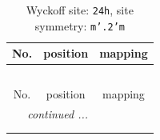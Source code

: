 \documentclass[fleqn,8pt]{jsarticle}
\begin{document}
\renewcommand{\arraystretch}{1.2}
\begin{longtable}{ccc}
\caption{Wyckoff site: {\tt 24h}, site symmetry: {\tt m'.2'm}}
 \\
 \hline \hline
No. & position & mapping \\ \hline \endfirsthead

\multicolumn{2}{l}{\tablename\ \thetable{}} \\
 \hline \hline
No. & position & mapping \\ \hline \endhead

 \hline \hline
\multicolumn{2}{r}{\footnotesize\it continued ...} \\ \endfoot

 \hline \hline
\multicolumn{2}{r}{} \\ \endlastfoot


\end{longtable}
\end{document}
